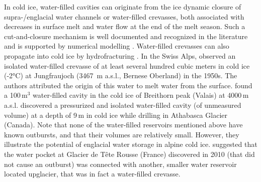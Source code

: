 In cold ice, water-filled cavities can originate from the ice dynamic closure of supra-/englacial water channels or water-filled crevasses, both associated with decreases in surface melt and water flow at the end of the melt season. Such a cut-and-closure mechanism is well documented and recognized in the literature \citep[e.g.][]{Gulley&al2009,Irvine&al2011} and is supported by numerical modelling \citep{Jarosch&Gudmundsson2012}. Water-filled crevasses can also propagate into cold ice by hydrofracturing \citep[e.g.][]{Benn&al2009,Scambos&al2009}. In the Swiss Alps, \cite{Haefeli&Brentani1955} observed an isolated water-filled crevasse of at least several hundred cubic meters in cold ice (-2°C) at Jungfraujoch (3467 \,m a.s.l., Bernese Oberland) in the 1950s. The authors attributed the origin of this water to melt water from the surface. \cite{Fisher1963} found a 100\,m$^3$ water-filled cavity in the cold ice of Breithorn peak (Valais) at 4000\,m a.s.l. \cite{Paterson&Savage1970} discovered a pressurized and isolated water-filled cavity (of unmeasured volume) at a depth of 9\,m in cold ice while drilling in Athabasca Glacier (Canada). Note that none of the water-filled reservoirs mentioned above have known outbursts, and that their volumes are relatively small. However, they illustrate the potential of englacial water storage in alpine cold ice. \cite{Vincent&al2015} suggested that the water pocket at Glacier de Tête Rousse (France) discovered in 2010 (that did not cause an outburst) was connected with another, smaller water reservoir located upglacier, that was in fact a water-filled crevasse. 
